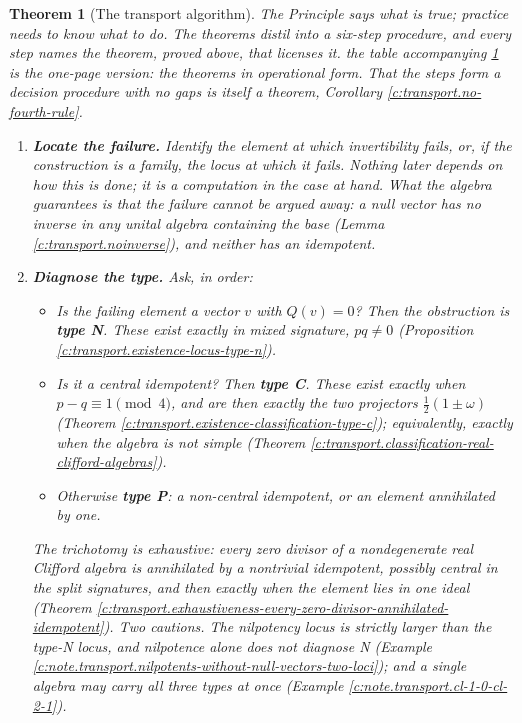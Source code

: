 \documentclass[11pt]{article}
\newtheorem{theorem}{Theorem}[section]
\theoremstyle{definition}
\theoremstyle{plain}
\newcommand{\changedmark}[2]{\marginpar{\raggedright\scriptsize\color{#1}#2}}
\begin{document}
\begin{theorem}[The transport algorithm]\label{c:transport.transport-algorithm}
\changedmark{gray}{reworded}
The Principle says what is true; practice needs to know what to do. The theorems distil into a six-step procedure, and every step names the theorem, proved above, that licenses it. the table accompanying \ref{c:transport.transport-algorithm} is the one-page version: the theorems in operational form. That the steps form a decision procedure with no gaps is itself a theorem, Corollary \ref{c:transport.no-fourth-rule}.




\begin{enumerate}
\item[\textbf{Step 1.}] \textbf{Locate the failure.} Identify the element at which invertibility fails, or, if the construction is a family, the locus at which it fails. Nothing later depends on how this is done; it is a computation in the case at hand. What the algebra guarantees is that the failure cannot be argued away: a null vector has no inverse in \emph{any} unital algebra containing the base (Lemma \ref{c:transport.noinverse}), and neither has an idempotent.

\item[\textbf{Step 2.}] \textbf{Diagnose the type.} Ask, in order:
  \begin{itemize}
  \item Is the failing element a vector $v$ with $Q(v) = 0$? Then the obstruction is \textbf{type N}. These exist exactly in mixed signature, $pq \neq 0$ (Proposition \ref{c:transport.existence-locus-type-n}).
  \item Is it a \emph{central} idempotent? Then \textbf{type C}. These exist exactly when $p - q \equiv 1 \pmod 4$, and are then exactly the two projectors $\tfrac12(1 \pm \omega)$ (Theorem \ref{c:transport.existence-classification-type-c}); equivalently, exactly when the algebra is not simple (Theorem \ref{c:transport.classification-real-clifford-algebras}).
  \item Otherwise \textbf{type P}: a non-central idempotent, or an element annihilated by one.
  \end{itemize}
  The trichotomy is exhaustive: every zero divisor of a nondegenerate real Clifford algebra is annihilated by a nontrivial idempotent, possibly central in the split signatures, and then exactly when the element lies in one ideal (Theorem \ref{c:transport.exhaustiveness-every-zero-divisor-annihilated-idempotent}). Two cautions. The nilpotency locus is strictly larger than the type-N locus, and nilpotence alone does not diagnose N (Example \ref{c:note.transport.nilpotents-without-null-vectors-two-loci}); and a single algebra may carry all three types at once (Example \ref{c:note.transport.cl-1-0-cl-2-1}).


\end{enumerate}
\end{theorem}
\end{document}
